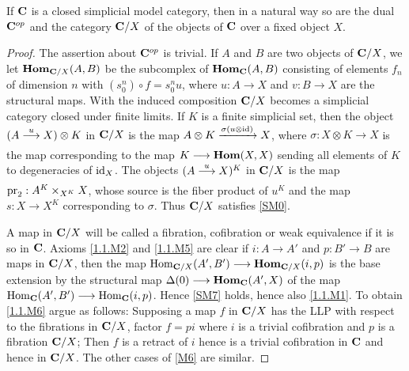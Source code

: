 \documentclass[../main]{subfiles}
\begin{document}
\begin{proposition}\label{prop:2.2.6}
    If $\mathbf{C}$ is a closed simplicial model category, then in a natural way so are the dual $\mathbf{C}^{op}$ and the category $\mathbf{C}/X$ of the objects of $\mathbf{C}$ over a fixed object $X$.
\end{proposition}
\begin{proof}
    The assertion about $\mathbf{C}^{op}$ is trivial. If $A$ and $B$ are two objects of $\mathbf{C}/X$, we let $\operatorname{\mathbf{Hom}}_{\mathbf{C}/X} (A,B)$ be the subcomplex of $\operatorname{\mathbf{Hom}}_{\mathbf{C}}(A,B)$ consisting of elements $f_n$ of dimension $n$ with $(s_0^n)\circ f = s^n_0u$, where $u:A\longrightarrow X$ and $v:B\longrightarrow X$ are the structural maps. With the induced composition $\mathbf{C}/X$ becomes a simplicial category closed under finite limits. If $K$ is a finite simplicial set, then the object $(A\varrightarrow{u} X)\otimes K$ in $\mathbf{C}/X$ is the map $A\otimes K \varrightarrow{\sigma(u\otimes \id)} X$, where $\sigma:X\otimes K\longrightarrow X$ is the map corresponding to the map $K\longrightarrow \operatorname{\mathbf{Hom}}(X,X)$ sending all elements of $K$ to degeneracies of $\operatorname{id}_X$. The objects $(A\varrightarrow{u}X)^K$ in $\mathbf{C}/X$ is the map $\operatorname{pr}_2:A^K\times_{X^K}X$, whose source is the fiber product of $u^K$ and the map $s:X\longrightarrow X^K$ corresponding to $\sigma$. Thus $\mathbf{C}/X$ satisfies \ref{SM0}.
    
    A map in $\mathbf{C}/X$ will be called a fibration, cofibration or weak equivalence if it is so in $\mathbf{C}$. Axioms \ref{1.1.M2} and \ref{1.1.M5} are clear if $i:A\longrightarrow A'$ and $p:B'\longrightarrow B$ are maps in $\mathbf{C}/X$, then the map $\operatorname{Hom}_{\mathbf{C}/X}(A',B')\longrightarrow \operatorname{\mathbf{Hom}}_{\mathbf{C}/X}(i,p)$ is the base extension by the structural map $\Delta(0)\longrightarrow \operatorname{\mathbf{Hom}}_{\mathbf{C}}(A',X)$ of the map \\$\operatorname{Hom}_{\mathbf{C}}(A',B')\longrightarrow \operatorname{Hom}_{\mathbf{C}}(i,p)$. Hence \ref{SM7} holds, hence also \ref{1.1.M1}. To obtain \ref{1.1.M6} argue as follows: Supposing a map $f$ in $\mathbf{C}/X$ has the LLP with respect to the fibrations in $\mathbf{C}/X$, factor $f=pi$ where $i$ is a trivial cofibration and $p$ is a fibration $\mathbf{C}/X$; Then $f$ is a retract of $i$ hence is a trivial cofibration in $\mathbf{C}$ and hence in $\mathbf{C}/X$. The other cases of \ref{M6} are similar.
\end{proof}
\end{document}
